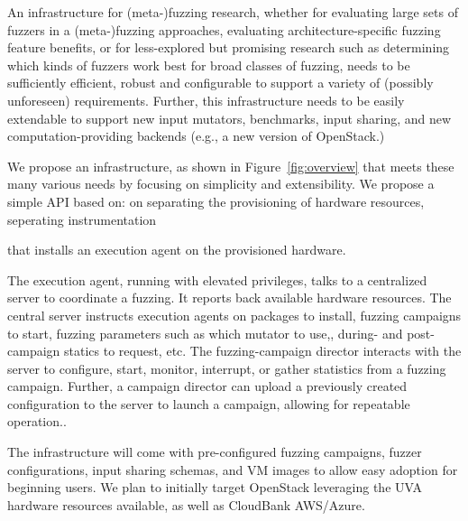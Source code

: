 



An infrastructure for (meta-)fuzzing research, 
whether for evaluating large sets of fuzzers in a (meta-)fuzzing approaches, 
evaluating architecture-specific fuzzing feature benefits, 
or for less-explored but promising research such as determining which kinds of 
fuzzers work best for broad classes of fuzzing, needs to be sufficiently 
efficient, robust and configurable to support a variety of (possibly 
unforeseen) requirements.  
Further, this infrastructure needs to be easily extendable to support new input 
mutators, benchmarks, input sharing, and new computation-providing backends 
(e.g., a new version of OpenStack.)

We propose an infrastructure, as shown in Figure~\ref{fig:overview} 
that meets these many various needs by focusing on 
simplicity and extensibility.  We propose a simple API based on:
on separating the provisioning of hardware resources,
seperating instrumentation 



that installs an execution agent on the provisioned hardware.   

The execution agent, running with elevated privileges, 
talks to a centralized server to coordinate a fuzzing.  It reports back 
available hardware resources.  The central server instructs execution agents on 
packages to install, fuzzing campaigns to start, fuzzing parameters such as 
which mutator to use,, during- and post-campaign statics to request, etc.  The 
fuzzing-campaign director interacts with the server to configure, start, 
monitor, interrupt, or gather statistics from a fuzzing campaign.  Further, a 
campaign director can upload a previously created configuration to the server 
to launch a campaign, allowing for repeatable operation..  

The infrastructure will come with pre-configured fuzzing campaigns, fuzzer 
configurations, input sharing schemas, and VM images to allow easy adoption for 
beginning users.  We plan to initially target OpenStack leveraging the UVA 
hardware resources available, as well as CloudBank AWS/Azure.

